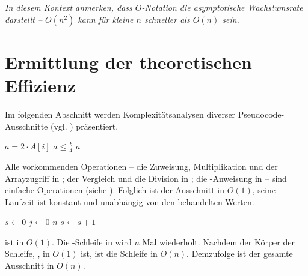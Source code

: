\emph{In diesem Kontext anmerken, dass $O$-Notation die \emph{asymptotische Wachstumsrate} darstellt -- $O(n^2)$ kann für kleine $n$ schneller als $O(n)$ sein.}





\section{Ermittlung der theoretischen Effizienz}
\label{sec:te-ermittlung}

Im folgenden Abschnitt werden Komplexitätsanalysen diverser Pseudocode-Ausschnitte (vgl. \cite[69ff]{sha2011}) präsentiert.

\begin{codebox}
    \li $a = 2 \cdot A[i]$          \label{ln:ex1-setup}
    \li \If $a \leq \frac{b}{4}$    \label{ln:ex1-if}
    \li     \Then
                \Return $a$         \label{ln:ex1-return}
            \End
\end{codebox}

Alle vorkommenden Operationen -- die Zuweisung, Multiplikation und der Arrayzugriff in ; der Vergleich und die Division in ; die \Return-Anweisung in  -- sind einfache Operationen (siehe ). Folglich ist der Ausschnitt in $O(1)$, seine Laufzeit ist konstant und unabhängig von den behandelten Werten.

\begin{codebox}
    \li $s \gets 0$                 \label{ln:ex2-outer-assignment}
    \li \For $j \gets 0$ \To $n$    \label{ln:ex2-for}
    \li     \Do
                $s \gets s + 1$     \label{ln:ex2-inner-assignment}
            \End
\end{codebox}

 ist in $O(1)$. Die \For-Schleife in  wird $n$ Mal wiederholt. Nachdem der Körper der Schleife, , in $O(1)$ ist, ist die Schleife in $O(n)$. Demzufolge ist der gesamte Ausschnitt in $O(n)$.

